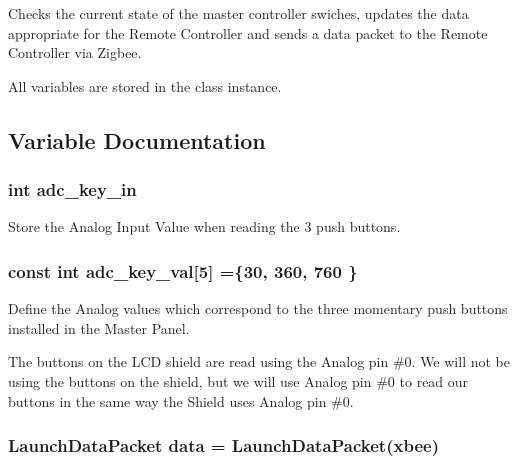 Checks the current state of the master controller swiches, updates the data appropriate for the Remote Controller and sends a data packet to the Remote Controller via Zigbee. 

All variables are stored in the class instance. 

\subsection{Variable Documentation}
\subsubsection[{\texorpdfstring{adc\+\_\+key\+\_\+in}{adc\_key\_in}}]{\setlength{\rightskip}{0pt plus 5cm}int adc\+\_\+key\+\_\+in}\hypertarget{masterPanel_8ino_a0cea6186dd3e0885b2ab52d918f062ad}{}\label{masterPanel_8ino_a0cea6186dd3e0885b2ab52d918f062ad}


Store the Analog Input Value when reading the 3 push buttons. 

\subsubsection[{\texorpdfstring{adc\+\_\+key\+\_\+val}{adc\_key\_val}}]{\setlength{\rightskip}{0pt plus 5cm}const int adc\+\_\+key\+\_\+val\mbox{[}5\mbox{]} =\{30, 360, 760 \}\hspace{0.3cm}{\ttfamily [static]}}\hypertarget{masterPanel_8ino_a3825b3540381c5eacce025d7c96ec83a}{}\label{masterPanel_8ino_a3825b3540381c5eacce025d7c96ec83a}


Define the Analog values which correspond to the three momentary push buttons installed in the Master Panel. 

The buttons on the L\+CD shield are read using the Analog pin \#0. We will not be using the buttons on the shield, but we will use Analog pin \#0 to read our buttons in the same way the Shield uses Analog pin \#0. 
\subsubsection[{\texorpdfstring{data}{data}}]{\setlength{\rightskip}{0pt plus 5cm}Launch\+Data\+Packet data = Launch\+Data\+Packet({\bf xbee})}\hypertarget{masterPanel_8ino_a2581ee7316bbd0b2c1f26d7892d9383b}{}\label{masterPanel_8ino_a2581ee7316bbd0b2c1f26d7892d9383b}


